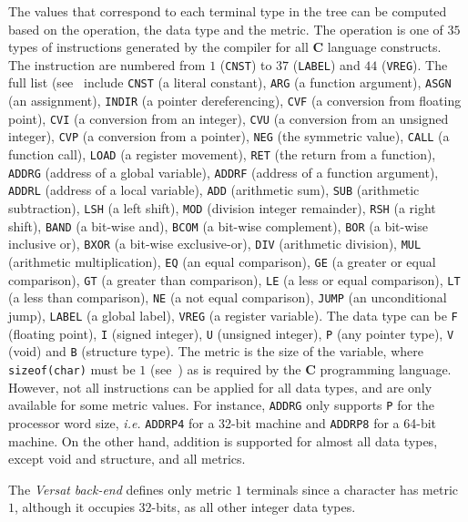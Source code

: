 The values that correspond to each terminal type in the
tree can be computed based on the operation, the data
type and the metric.
The operation is one of $35$ types of instructions
generated by the compiler for all {\bf C} language constructs.
The instruction are numbered from $1$ ({\tt CNST}) to $37$
({\tt LABEL}) and $44$ ({\tt VREG}).
The full list (see~\cite[p.84]{hanson95} include
{\tt CNST} (a literal constant),
{\tt ARG} (a function argument),
{\tt ASGN} (an assignment),
{\tt INDIR} (a pointer dereferencing),
{\tt CVF} (a conversion from floating point),
{\tt CVI} (a conversion from an integer),
{\tt CVU} (a conversion from an unsigned integer),
{\tt CVP} (a conversion from a pointer),
{\tt NEG} (the symmetric value),
{\tt CALL} (a function call),
{\tt LOAD} (a register movement),
{\tt RET} (the return from a function),
{\tt ADDRG} (address of a global variable),
{\tt ADDRF} (address of a function argument),
{\tt ADDRL} (address of a local variable),
{\tt ADD} (arithmetic sum),
{\tt SUB} (arithmetic subtraction),
{\tt LSH} (a left shift),
{\tt MOD} (division integer remainder),
{\tt RSH} (a right shift),
{\tt BAND} (a bit-wise and),
{\tt BCOM} (a bit-wise complement),
{\tt BOR} (a bit-wise inclusive or),
{\tt BXOR} (a bit-wise exclusive-or),
{\tt DIV} (arithmetic division),
{\tt MUL} (arithmetic multiplication),
{\tt EQ} (an equal comparison),
{\tt GE} (a greater or equal comparison),
{\tt GT} (a greater than comparison),
{\tt LE} (a less or equal comparison),
{\tt LT} (a less than comparison),
{\tt NE} (a not equal comparison),
{\tt JUMP} (an unconditional jump),
{\tt LABEL} (a global label),
{\tt VREG} (a register variable).
The data type can be {\tt F} (floating point),
{\tt I} (signed integer), {\tt U} (unsigned integer),
{\tt P} (any pointer type), {\tt V} (void) and
{\tt B} (structure type).
The metric is the size of the variable,
where {\tt sizeof(char)} must be $1$
(see~\cite[p.79]{hanson95})
as is required by the {\bf C} programming language.
However, not all instructions can be applied for all
data types, and are only available for some metric values.
For instance, {\tt ADDRG} only supports {\tt P} for
the processor word size, {\em i.e.} {\tt ADDRP4} for
a 32-bit machine and {\tt ADDRP8} for a 64-bit machine.
On the other hand, addition is supported for almost
all data types, except void and structure,
and all metrics.

The {\it Versat} {\it back-end} defines only metric
$1$ terminals since a character has metric $1$,
although it occupies 32-bits, as all other
integer data types.

